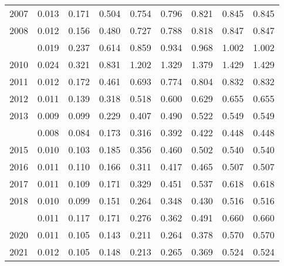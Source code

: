 \documentclass[
]{article}
\begin{document}
\begin{longtable}[t]{lrrrrrrrr}
2007 & 0.013 & 0.171 & 0.504 & 0.754 & 0.796 & 0.821 & 0.845 & 0.845\\
2008 & 0.012 & 0.156 & 0.480 & 0.727 & 0.788 & 0.818 & 0.847 & 0.847\\
\addlinespace
2009 & 0.019 & 0.237 & 0.614 & 0.859 & 0.934 & 0.968 & 1.002 & 1.002\\
2010 & 0.024 & 0.321 & 0.831 & 1.202 & 1.329 & 1.379 & 1.429 & 1.429\\
2011 & 0.012 & 0.172 & 0.461 & 0.693 & 0.774 & 0.804 & 0.832 & 0.832\\
2012 & 0.011 & 0.139 & 0.318 & 0.518 & 0.600 & 0.629 & 0.655 & 0.655\\
2013 & 0.009 & 0.099 & 0.229 & 0.407 & 0.490 & 0.522 & 0.549 & 0.549\\
\addlinespace
2014 & 0.008 & 0.084 & 0.173 & 0.316 & 0.392 & 0.422 & 0.448 & 0.448\\
2015 & 0.010 & 0.103 & 0.185 & 0.356 & 0.460 & 0.502 & 0.540 & 0.540\\
2016 & 0.011 & 0.110 & 0.166 & 0.311 & 0.417 & 0.465 & 0.507 & 0.507\\
2017 & 0.011 & 0.109 & 0.171 & 0.329 & 0.451 & 0.537 & 0.618 & 0.618\\
2018 & 0.010 & 0.099 & 0.151 & 0.264 & 0.348 & 0.430 & 0.516 & 0.516\\
\addlinespace
2019 & 0.011 & 0.117 & 0.171 & 0.276 & 0.362 & 0.491 & 0.660 & 0.660\\
2020 & 0.011 & 0.105 & 0.143 & 0.211 & 0.264 & 0.378 & 0.570 & 0.570\\
2021 & 0.012 & 0.105 & 0.148 & 0.213 & 0.265 & 0.369 & 0.524 & 0.524\\*
\end{longtable}
\end{document}
